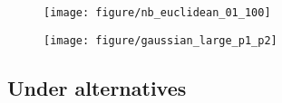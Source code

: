 \documentclass{article}
\begin{document}
\begin{figure}[ht]
  \centering
  \texttt{[image: figure/nb\_euclidean\_01\_100]}
  \caption{\label{fig:label} }
\end{figure}

\begin{figure}[ht]
  \centering
  \texttt{[image: figure/gaussian\_large\_p1\_p2]}
  \caption{\label{fig:label} }
\end{figure}

\subsection{Under alternatives}



\end{document}
